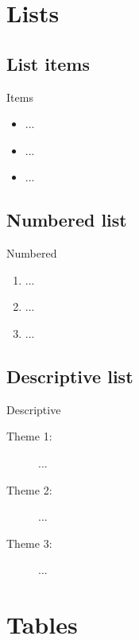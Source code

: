 \documentclass{presentation-beamer}
\begin{document}
\section{Lists}

\subsection{List items}

\begin{frame}{Items}

	\begin{itemize}
		\item ...
    \item ...
    \item ...
  \end{itemize}
  
\end{frame} 

\subsection{Numbered list}

\begin{frame}{Numbered}

	\begin{enumerate}
		\item ...
    \item ...
    \item ...
  \end{enumerate}
  
\end{frame} 

\subsection{Descriptive list} 

\begin{frame}{Descriptive} 

	\begin{description}
		\item [Theme 1:] ...
		\item [Theme 2:] ...
		\item [Theme 3:] ...
	\end{description}

\end{frame}


\section{Tables}
\end{document}
